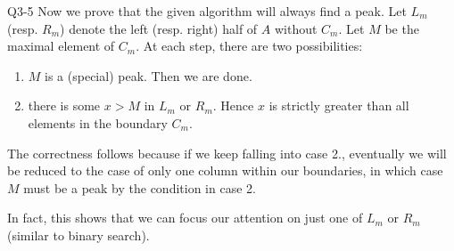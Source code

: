 \documentclass[t]{beamer}
\begin{document}
\begin{frame}{Q3-5}
  Now we prove that the given algorithm will always find a peak. Let $L_m$ (resp. $R_m$) denote the left (resp. right) half of $A$ without $C_m$. Let $M$ be the maximal element of $C_m$. 
  At each step, there are two possibilities:
  \begin{enumerate}
    \item $M$ is a (special) peak. Then we are done. 
    \item there is some $x > M$ in $L_m$ or $R_m$. Hence $x$ is strictly greater than all elements in the boundary $C_m$. 
  \end{enumerate}
  The correctness follows because if we keep falling into case 2., eventually we will be reduced to the case of only one column within our boundaries, in which case $M$ must be a peak by the condition in case 2.
  \par In fact, this shows that we can focus our attention on just one of $L_m$ or $R_m$ (similar to binary search). 
\end{frame}
\end{document}
